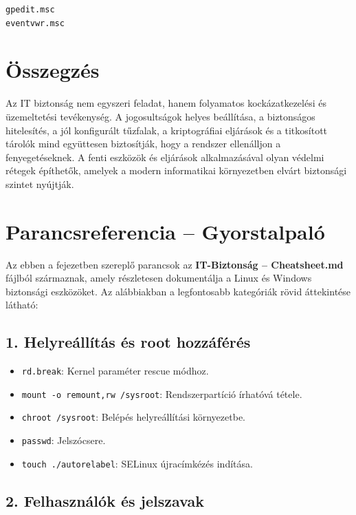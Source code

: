 \documentclass[12pt,a4paper]{article}
\begin{document}
\begin{lstlisting}[language=bash,caption={Windows és Linux audit eszközök}]
gpedit.msc
eventvwr.msc
\end{lstlisting}

\section{Összegzés}
Az IT biztonság nem egyszeri feladat, hanem folyamatos kockázatkezelési és üzemeltetési tevékenység. A jogosultságok helyes beállítása, a biztonságos hitelesítés, a jól konfigurált tűzfalak, a kriptográfiai eljárások és a titkosított tárolók mind együttesen biztosítják, hogy a rendszer ellenálljon a fenyegetéseknek. A fenti eszközök és eljárások alkalmazásával olyan védelmi rétegek építhetők, amelyek a modern informatikai környezetben elvárt biztonsági szintet nyújtják.

\appendix
\section{Parancsreferencia – Gyorstalpaló}

Az ebben a fejezetben szereplő parancsok az \textbf{IT-Biztonság – Cheatsheet.md} fájlból származnak, amely részletesen dokumentálja a Linux és Windows biztonsági eszközöket. Az alábbiakban a legfontosabb kategóriák rövid áttekintése látható:

\subsection{1. Helyreállítás és root hozzáférés}

\begin{itemize}
  \item \texttt{rd.break}: Kernel paraméter rescue módhoz.
  \item \texttt{mount -o remount,rw /sysroot}: Rendszerpartíció írhatóvá tétele.
  \item \texttt{chroot /sysroot}: Belépés helyreállítási környezetbe.
  \item \texttt{passwd}: Jelszócsere.
  \item \texttt{touch ./autorelabel}: SELinux újracímkézés indítása.
\end{itemize}

\subsection{2. Felhasználók és jelszavak}
\end{document}
